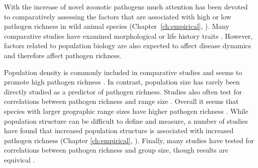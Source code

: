 





With the increase of novel zoonotic pathogens \cite{jones2008global} much attention has been devoted to comparatively assessing the factors that are associated with high or low pathogen richness in wild animal species (Chapter~\ref{ch:empirical}, \cites{poulin2000diversity, kamiya2014determines, luis2013comparison}).
Many comparative studies have examined morphological or life history traits \cite{kamiya2014determines, luis2013comparison}.
However, factors related to population biology are also expected to affect disease dynamics and therefore affect pathogen richness.

Population density is commonly included in comparative studies and seems to promote high pathogen richness \cite{morand1998density, kamiya2014determines, lindenfors2007parasite, nunn2003comparative, arneberg2002host}.
In contrast, population size has rarely been directly studied as a predictor of pathogen richness.
Studies also often test for correlations between pathogen richness and range size \cite{lindenfors2007parasite, nunn2003comparative, turmelle2009correlates, huang2015parasite, kamiya2014determines}.
Overall it seems that species with larger geographic range sizes have higher pathogen richness \cite{kamiya2014determines}.
While population structure can be difficult to define and measure, a number of studies have found that increased population structure is associated with increased pathogen richness (Chapter \ref{ch:empirical}, \cites{maganga2014bat, turmelle2009correlates}).
Finally, many studies have tested for correlations between pathogen richness and group size, though results are equivical \cite{vitone2004body, gay2014parasite, ezenwa2006host, rifkin2012animals, nunn2003comparative}.


